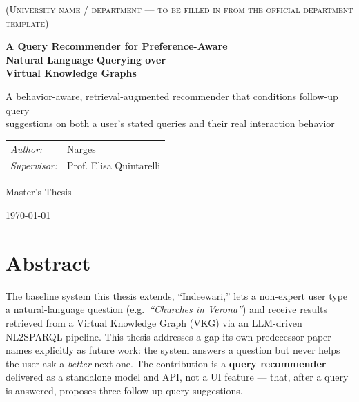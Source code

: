 \documentclass[11pt,a4paper,oneside]{book}
\begin{document}
\begin{titlepage}
\centering
\vspace*{2cm}

{\Large \scshape (University name / department --- to be filled in from the official
department template) \par}

\vspace{2.5cm}

{\Huge \bfseries A Query Recommender for Preference-Aware\\[4pt] Natural Language Querying over\\[4pt] Virtual Knowledge Graphs \par}

\vspace{1.5cm}

{\Large A behavior-aware, retrieval-augmented recommender that conditions follow-up query\\
suggestions on both a user's stated queries and their real interaction behavior \par}

\vspace{3cm}

{\large
\begin{tabular}{ll}
\textit{Author:} & Narges \\[6pt]
\textit{Supervisor:} & Prof. Elisa Quintarelli \\
\end{tabular}
\par}

\vfill

{\large Master's Thesis \par}
{\large \today \par}

\end{titlepage}

\frontmatter

\chapter*{Abstract}

The baseline system this thesis extends, ``Indeewari,'' lets a non-expert user type a
natural-language question (e.g.\ \emph{``Churches in Verona''}) and receive results retrieved from
a Virtual Knowledge Graph (VKG) via an LLM-driven NL2SPARQL pipeline. This thesis addresses a gap
its own predecessor paper names explicitly as future work: the system answers a question but never
helps the user ask a \emph{better} next one. The contribution is a \textbf{query recommender} ---
delivered as a standalone model and API, not a UI feature --- that, after a query is answered,
proposes three follow-up query suggestions.
\end{document}

